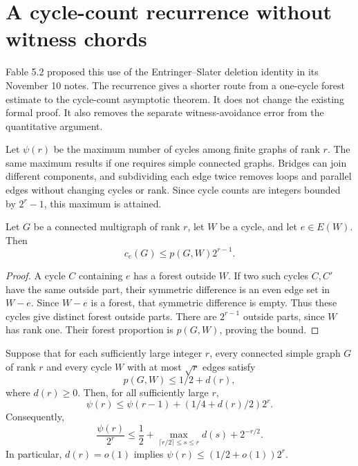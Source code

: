 \section{A cycle-count recurrence without witness chords}
\label{sec:cycle-recursion}

Fable 5.2 proposed this use of the Entringer--Slater deletion identity in its November 10 notes.
The recurrence gives a shorter route from a one-cycle forest estimate to the cycle-count asymptotic theorem.
It does not change the existing formal proof.
It also removes the separate witness-avoidance error from the quantitative argument.

Let $\psi(r)$ be the maximum number of cycles among finite graphs of rank $r$.
The same maximum results if one requires simple connected graphs.
Bridges can join different components, and subdividing each edge twice removes loops and parallel edges without changing cycles or rank.
Since cycle counts are integers bounded by $2^r-1$, this maximum is attained.

\begin{lemma}\label{lem:recursion-marked-edge}
Let $G$ be a connected multigraph of rank $r$, let $W$ be a cycle, and let $e\in E(W)$.
Then
\[
 c_e(G)\le p(G,W)2^{r-1}.
\]
\end{lemma}

\begin{proof}
A cycle $C$ containing $e$ has a forest outside $W$.
If two such cycles $C,C'$ have the same outside part, their symmetric difference is an even edge set in $W-e$.
Since $W-e$ is a forest, that symmetric difference is empty.
Thus these cycles give distinct forest outside parts.
There are $2^{r-1}$ outside parts, since $W$ has rank one.
Their forest proportion is $p(G,W)$, proving the bound.
\end{proof}

\begin{proposition}\label{prop:cycle-forest-recurrence}
Suppose that for each sufficiently large integer $r$, every connected simple graph $G$ of rank $r$
and every cycle $W$ with at most $\sqrt r$ edges satisfy
\[
 p(G,W)\le1/2+d(r),
\]
where $d(r)\ge0$.
Then, for all sufficiently large $r$,
\begin{equation}\label{eq:cycle-deletion-recurrence}
 \psi(r)\le\psi(r-1)+(1/4+d(r)/2)2^r.
\end{equation}
Consequently,
\begin{equation}\label{eq:cycle-recursion-window}
 \frac{\psi(r)}{2^r}
 \le\frac12+
 \max_{\lceil r/2\rceil\le s\le r}d(s)+2^{-r/2}.
\end{equation}
In particular, $d(r)=o(1)$ implies $\psi(r)\le(1/2+o(1))2^r$.
\end{proposition}

